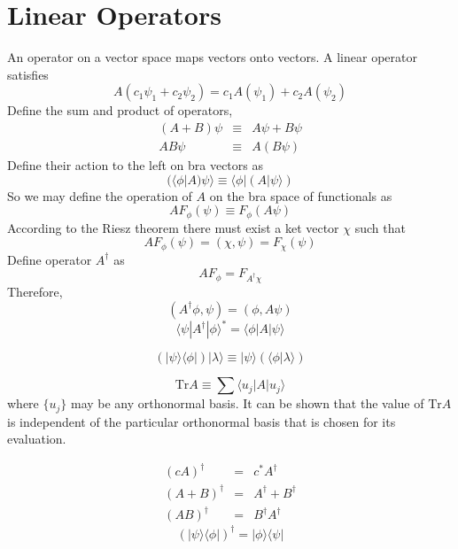 \section{Linear Operators}
\begin{newdef}
An operator on a vector space maps vectors onto vectors.
A linear operator satisfies
\[A (c_1 \psi_1 + c_2 \psi_2) = c_1 A(\psi_1) + c_2 A(\psi_2)\]
Define the sum and product of operators,
\begin{eqnarray}
(A+B)\psi &\equiv & A\psi + B\psi \nonumber \\
A B \psi &\equiv & A (B\psi) \nonumber
\end{eqnarray}
Define their action to the left on bra vectors as
\[(\langle \phi | A ) \psi \rangle \equiv \langle \phi | ( A | \psi \rangle )\]
So we may define the operation of $A$ on the bra space of functionals as
\[A F_{\phi} (\psi) \equiv F_{\phi}(A\psi)\]
According to the Riesz theorem there must exist a ket vector $\chi$ such that
\[AF_{\phi}(\psi) = (\chi, \psi) = F_{\chi}(\psi)\]
Define operator $A^{\dagger}$ as
\[AF_{\phi} = F_{A^{\dagger}\chi}\]
Therefore,
\[(A^{\dagger}\phi, \psi) = (\phi, A\psi)\]
\[\langle \psi | A^{\dagger} | \phi \rangle ^* = \langle \phi | A | \psi \rangle\]
\end{newdef}

\begin{newdef}
\[(| \psi \rangle \langle \phi |) | \lambda \rangle \equiv | \psi \rangle (\langle \phi | \lambda \rangle)\]
\end{newdef}

\begin{newdef}[Trace]
\[ \mathrm{Tr} A \equiv \sum \langle u_j | A | u_j \rangle \]
where $\{ u_j \}$ may be any orthonormal basis. It can be shown that the value of $\mathrm{Tr}A$ is independent of the particular orthonormal basis that is chosen for its evaluation.
\end{newdef}

\begin{newprop}
\begin{eqnarray}
(cA)^{\dagger} &=& c^* A^{\dagger} \nonumber \\
(A + B)^{\dagger} &=& A^{\dagger} + B^{\dagger} \nonumber \\
(AB)^{\dagger} &=& B^{\dagger}  A^{\dagger} \nonumber
\end{eqnarray}
\[(| \psi \rangle \langle \phi |) ^ {\dagger} = | \phi \rangle \langle \psi |\]
\end{newprop}


